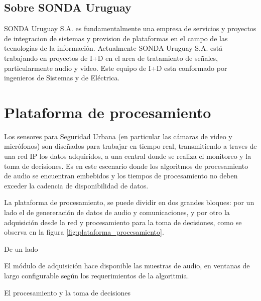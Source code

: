 \documentclass{article}
\begin{document}
\subsection{Sobre SONDA Uruguay}
\label{SONDA Uruguay}

SONDA Uruguay S.A. es fundamentalmente una empresa de servicios y proyectos de integracion de sistemas y provision de plataformas en el campo de las tecnologías de la información. Actualmente SONDA Uruguay S.A. está trabajando en proyectos de I+D en el area de tratamiento de señales, particularmente audio y video. Este equipo de I+D esta conformado por ingenieros de Sistemas y de Eléctrica.


 

\section{Plataforma de procesamiento}

Los sensores para Seguridad Urbana (en particular las cámaras de video y micrófonos) son diseñados para trabajar en tiempo real, transmitiendo a traves de una red IP los datos adquiridos, a una central donde se realiza el monitoreo y la toma de decisiones. Es en este escenario donde los algoritmos de procesamiento de audio se encuentran embebidos y los tiempos de procesamiento no deben exceder la cadencia de disponibilidad de datos.

La plataforma de procesamiento, se puede dividir en dos grandes bloques: por un lado el de genereración de datos de audio y comunicaciones, y por otro la adquisición desde la red y procesamiento para la toma de decisiones, como se observa en la figura \ref{fig:plataforma_procesamiento}.

De un lado 

El módulo de adquisición hace disponible las muestras de audio, en ventanas de largo configurable según los requerimientos de la algoritmia.

El procesamiento y la toma de decisiones 
\end{document}
